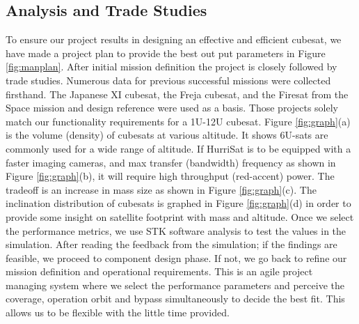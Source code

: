 \subsection{Analysis and Trade Studies}
To ensure our project results in designing an effective and efficient cubesat, we have made a project plan to provide the best out put parameters in Figure \ref{fig:manplan}. After initial mission definition the project is closely followed by trade studies. Numerous data for previous successful missions were collected firsthand. The Japanese XI \cite{EoPortal2002} cubesat, the Freja \cite{Freja} cubesat, and the Firesat from the Space mission and design \cite{Larson1999} reference were used as a basis. Those projects solely match our functionality requirements for a 1U-12U cubesat. Figure \ref{fig:graph}(a) is the volume (density) of cubesats at various altitude. It shows 6U-sats are commonly used for a wide range of altitude. If HurriSat is to be equipped with a faster imaging cameras, and max transfer (bandwidth) frequency as shown in Figure \ref{fig:graph}(b), it will require high throughput (red-accent) power. The tradeoff is an increase in mass size as shown in Figure \ref{fig:graph}(c). The inclination distribution of cubesats is graphed in Figure \ref{fig:graph}(d) in order to provide some insight on satellite footprint with mass and altitude. 
Once we select the performance metrics, we use STK \cite{AGISolutions2021} software analysis to test the values in the simulation. After reading the feedback from the simulation; if the findings are feasible, we proceed to component design phase. If not, we go back to refine our mission definition and operational requirements. This is an agile project managing system where we select the performance parameters and perceive the coverage, operation orbit and bypass simultaneously to decide the best fit. This allows us to be flexible with the little time provided.

